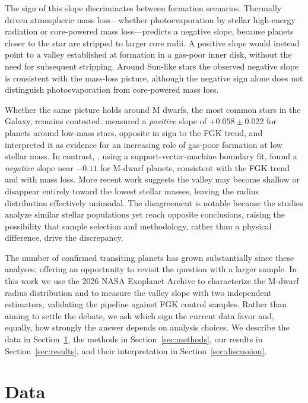 \documentclass[twocolumn]{aastex701}
\begin{document}
The sign of this slope discriminates between formation scenarios. Thermally
driven atmospheric mass loss---whether photoevaporation by stellar high-energy
radiation \citep{OwenWu2017} or core-powered mass loss---predicts a negative
slope, because planets closer to the star are stripped to larger core radii. A
positive slope would instead point to a valley established at formation in a
gas-poor inner disk, without the need for subsequent stripping. Around
Sun-like stars the observed negative slope is consistent with the mass-loss
picture, although the negative sign alone does not distinguish photoevaporation
from core-powered mass loss.

Whether the same picture holds around M dwarfs, the most common stars in the
Galaxy, remains contested. \citet{Cloutier2020} measured a \emph{positive}
slope of $+0.058 \pm 0.022$ for planets around low-mass stars, opposite in sign
to the FGK trend, and interpreted it as evidence for an increasing role of
gas-poor formation at low stellar mass. In contrast, \citet{VanEylen2021},
using a support-vector-machine boundary fit, found a \emph{negative} slope near
$-0.11$ for M-dwarf planets, consistent with the FGK trend and with mass loss.
More recent work suggests the valley may become shallow or disappear entirely
toward the lowest stellar masses, leaving the radius distribution effectively
unimodal. The disagreement is notable because the studies analyze similar
stellar populations yet reach opposite conclusions, raising the possibility
that sample selection and methodology, rather than a physical difference,
drive the discrepancy.

The number of confirmed transiting planets has grown substantially since these
analyses, offering an opportunity to revisit the question with a larger sample.
In this work we use the 2026 NASA Exoplanet Archive to characterize the
M-dwarf radius distribution and to measure the valley slope with two
independent estimators, validating the pipeline against FGK control samples.
Rather than aiming to settle the debate, we ask which sign the current data
favor and, equally, how strongly the answer depends on analysis choices. We
describe the data in Section~\ref{sec:data}, the methods in
Section~\ref{sec:methods}, our results in Section~\ref{sec:results}, and their
interpretation in Section~\ref{sec:discussion}.

\section{Data} \label{sec:data}
\end{document}
